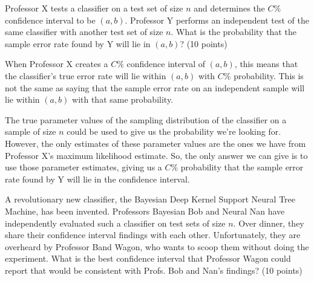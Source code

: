 \documentclass[fleqn]{homework}
\begin{document}
  \begin{problem}{3}
    \begin{question}
      Professor X tests a classifier on a test set of size $n$ and determines
      the $C\%$ confidence interval to be $(a,b)$.  Professor Y performs an
      independent test of the same classifier with another test set of size $n$.
      What is the probability that the sample error rate found by Y will lie in
      $(a,b)$? (10 points)
    \end{question}

    When Professor X creates a $C\%$ confidence interval of $(a,b)$, this means
    that the classifier's true error rate will lie within $(a,b)$ with $C\%$
    probability.  This is not the same as saying that the sample error rate on
    an independent sample will lie within $(a,b)$ with that same probability.

    The true parameter values of the sampling distribution of the classifier on
    a sample of size $n$ could be used to give us the probability we're looking
    for.  However, the only estimates of these parameter values are the ones we
    have from Professor X's maximum likelihood estimate.  So, the only answer we
    can give is to use those parameter estimates, giving us a $C\%$ probability
    that the sample error rate found by Y will lie in the confidence interval.
  \end{problem}

  \begin{problem}{4}
    \begin{question}
      A revolutionary new classifier, the Bayesian Deep Kernel Support Neural
      Tree Machine, has been invented.  Professors Bayesian Bob and Neural Nan
      have independently evaluated such a classifier on test sets of size $n$.
      Over dinner, they share their confidence interval findings with each
      other.  Unfortunately, they are overheard by Professor Band Wagon, who
      wants to scoop them without doing the experiment.  What is the best
      confidence interval that Professor Wagon could report that would be
      consistent with Profs. Bob and Nan's findings? (10 points)
    \end{question}
  \end{problem}
\end{document}
